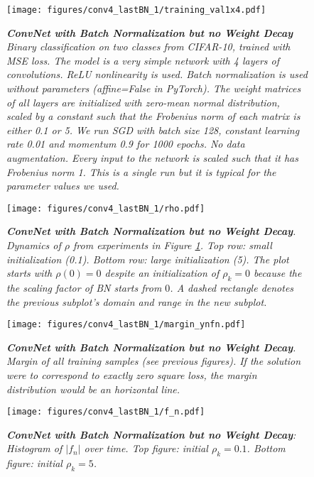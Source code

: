 \documentclass[11pt]{article}
\begin{document}
\begin{figure}
  \centering
  \texttt{[image: figures/conv4\_lastBN\_1/training\_val1x4.pdf]}   
  \caption {\it \textbf{ConvNet with Batch Normalization but no Weight Decay}  Binary classification on two classes from CIFAR-10,
    trained with MSE loss. The model is a very simple network with 4
    layers of convolutions. ReLU nonlinearity is used. Batch
    normalization is used without parameters (affine=False in
    PyTorch). The weight matrices of all layers are initialized with
    zero-mean normal distribution, scaled by a constant such that the
    Frobenius norm of each matrix is either 0.1 or 5. We run SGD with
    batch size 128, constant learning rate 0.01 and momentum 0.9 for
    1000 epochs. No data augmentation.   Every input
    to the network is scaled such that it has Frobenius norm 1. This
    is a single run but it is typical for the parameter values we used. }          
  \label{fig:convBN:training_val}
\end{figure}

\begin{figure}
  \centering
  \texttt{[image: figures/conv4\_lastBN\_1/rho.pdf]}
  \caption {\it \textbf{ConvNet with Batch Normalization but no Weight Decay}. Dynamics of $\rho$ from experiments in Figure
    \ref{fig:convBN:training_val}. Top row: small initialization
    (0.1).  Bottom row: large initialization (5). The plot starts with
    $\rho(0)=0$ despite an initialization of $\rho_k=0$ because the the scaling factor of BN starts from $0$. A dashed rectangle denotes the previous subplot's domain and range in the new subplot.      }      
  \label{fig:convBN:rho}
\end{figure}


\begin{figure}
  \centering
  \texttt{[image: figures/conv4\_lastBN\_1/margin\_ynfn.pdf]}
  \caption {\it \textbf{ConvNet with Batch Normalization but no Weight Decay}. Margin of all training samples (see previous
    figures). If the solution were to correspond to exactly zero
    square loss, the margin distribution would be an horizontal line. }  \label{fig:convBN:margin}
\end{figure}

\begin{figure}
  \centering
  \texttt{[image: figures/conv4\_lastBN\_1/f\_n.pdf]}
  \caption {\it \textbf{ConvNet with Batch Normalization but no Weight Decay}: Histogram of $|f_n|$ over time. Top figure: initial $\rho_k=0.1$.  Bottom figure: initial $\rho_k=5$.}  \label{fig:convBN:f_n}      
\end{figure}
\end{document}

